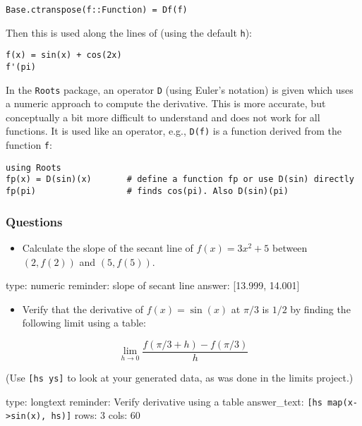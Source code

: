 \documentclass[12pt]{article}
\begin{document}
\begin{verbatim}
Base.ctranspose(f::Function) = Df(f) 
\end{verbatim}
Then this is used along the lines of (using the default \texttt{h}):



\begin{verbatim}
f(x) = sin(x) + cos(2x)
f'(pi)  
\end{verbatim}
In the \texttt{Roots} package, an operator \texttt{D} (using Euler's
notation) is given which uses a numeric approach to compute the
derivative. This is more accurate, but conceptually a bit more difficult
to understand and does not work for all functions. It is used like an
operator, e.g., \texttt{D(f)} is a function derived from the function
\texttt{f}:



\begin{verbatim}
using Roots
fp(x) = D(sin)(x)       # define a function fp or use D(sin) directly
fp(pi)                  # finds cos(pi). Also D(sin)(pi)
\end{verbatim}
\subsubsection{Questions}

\begin{itemize}
\itemsep1pt\parskip0pt
\item
  Calculate the slope of the secant line of $f(x) = 3x^2 + 5$ between
  $(2,f(2))$ and $(5, f(5))$.
\end{itemize}

\begin{answer}
    type: numeric
    reminder: slope of secant line
    answer: [13.999, 14.001]

\end{answer}

\begin{itemize}
\itemsep1pt\parskip0pt
\item
  Verify that the derivative of $f(x) = \sin(x)$ at $\pi/3$ is $1/2$ by
  finding the following limit using a table:
\end{itemize}

\[
\lim_{h \rightarrow 0} \frac{f(\pi/3 + h) - f(\pi/3)}{h}
\]

(Use \texttt{{[}hs ys{]}} to look at your generated data, as was done in
the limits project.)

\begin{answer}
type: longtext
reminder: Verify derivative using a table
answer_text: \verb+[hs map(x->sin(x), hs)]+ 
rows: 3
cols: 60
\end{answer}
\end{document}
